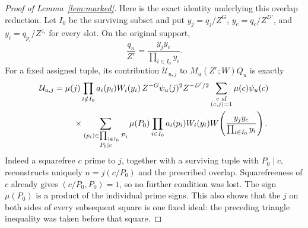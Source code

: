 \documentclass[11pt,a4paper]{article}
\numberwithin{equation}{section}
\numberwithin{figure}{section}
\theoremstyle{definition}
\theoremstyle{remark}
\begin{document}
\begin{proof}[Proof of Lemma~\ref{lem:marked}]
Here is the exact identity underlying this overlap reduction.  Let
\(I_0\) be the surviving subset and put
\(y_j=q_j/Z^G\), \(y_c=q_c/Z^{D'}\), and
\(y_i=q_{p_i}/Z^{z_i}\) for every slot.  On the original support,
\[
 \frac{q_n}{Z^r}=\frac{y_jy_c}{\prod_{i\in I_0}y_i}.
\]
For a fixed assigned tuple, its contribution \(\mathcal U_{u,j}\) to
\(M_u(Z^r;W)Q_u\) is exactly
\begin{equation}\label{eq:initial-overlap-polynomial}
 \begin{split}
 \mathcal U_{u,j}={}&\mu(j)
 \prod_{i\notin I_0}a_i(p_i)W_i(y_i)\,
 Z^{-G}\psi_u(j)^2 Z^{-D'/2}
 \sum_{\substack{c\ {\rm sf}\\(c,j)=1}}\mu(c)\psi_u(c)\\
 &\quad\times
 \sum_{\substack{(p_i)\in\prod_{i\in I_0}\mathcal P_i\\P_0\mid c}}
 \mu(P_0)\prod_{i\in I_0}a_i(p_i)W_i(y_i)
 W\!\left(\frac{y_jy_c}{\prod_{i\in I_0}y_i}\right).
 \end{split}
\end{equation}
Indeed a squarefree \(c\) prime to \(j\), together with a surviving
tuple with \(P_0\mid c\), reconstructs uniquely
\(n=j(c/P_0)\) and the prescribed overlap.  Squarefreeness of \(c\)
already gives \((c/P_0,P_0)=1\), so no further condition was lost.
The sign \(\mu(P_0)\) is a product of the individual prime signs.
This also shows that the \(j\) on both sides of every subsequent
square is one fixed ideal: the preceding triangle inequality was
taken before that square.


\end{proof}
\end{document}
